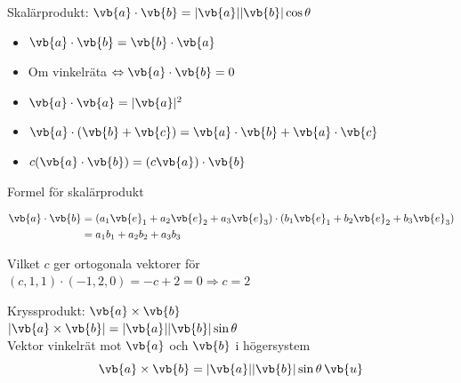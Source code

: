 Skalärprodukt: $\vb{a} \cdot \vb{b} = |\vb{a}||\vb{b}|\cos\theta$

\begin{minipage}{0.4\linewidth}
\end{minipage}
\begin{minipage}{0.58\linewidth}
\begin{itemize}[label=--]
  \item $\vb{a} \cdot \vb{b} = \vb{b} \cdot \vb{a}$
  \item Om vinkelräta $\Leftrightarrow \vb{a} \cdot \vb{b} = 0$
  \item $\vb{a} \cdot \vb{a} = |\vb{a}|^2$
  \item $\vb{a} \cdot (\vb{b} + \vb{c}) = \vb{a} \cdot \vb{b} + \vb{a} \cdot \vb{c}$
  \item $c(\vb{a} \cdot \vb{b}) = (c\vb{a}) \cdot \vb{b}$
\end{itemize}
\end{minipage}

\begin{center}Formel för skalärprodukt\end{center}
\begin{align*}
\vb{a} \cdot \vb{b} &= (a_1\vb{e}_1 + a_2\vb{e}_2 + a_3\vb{e}_3) \cdot (b_1\vb{e}_1 + b_2\vb{e}_2 + b_3\vb{e}_3) \\
&= a_1b_1 + a_2b_2 + a_3b_3
\end{align*}

\begin{example}[1.4]
Vilket $c$ ger ortogonala vektorer för\\
$(c, 1, 1) \cdot (-1, 2, 0) = -c + 2 = 0 \Rightarrow c = 2$
\end{example}

\begin{minipage}{0.55\linewidth}
Kryssprodukt: $\vb{a} \times \vb{b}$\\
$|\vb{a} \times \vb{b}| = |\vb{a}||\vb{b}|\sin\theta$\\
Vektor vinkelrät mot $\vb{a}$ och $\vb{b}$ i högersystem
\[ \vb{a} \times \vb{b} = |\vb{a}||\vb{b}|\sin\theta\,\vb{u} \]
\end{minipage}
\begin{minipage}{0.43\linewidth}
\end{minipage}

